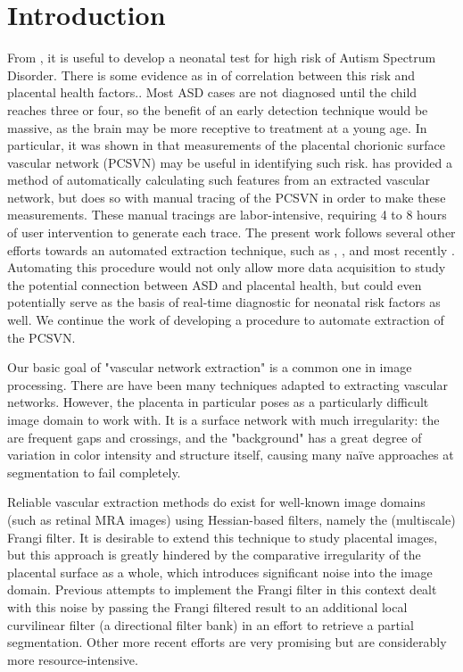 \chapter{Introduction} \label{ch:introduction}

From \cite{chang2017}, it is useful to develop a neonatal test for high risk of
Autism Spectrum Disorder. There is some evidence as in \cite{chang2016whole}
of correlation between this risk and placental health factors.. Most ASD
cases are not diagnosed until the child reaches three or four, so the benefit
of an early detection technique would be massive, as the brain may be more
receptive to treatment at a young age. In particular, it was shown in
\cite{chang2016whole} that measurements of the placental chorionic surface
vascular network (PCSVN) may be useful in identifying such risk.
\cite{chang2017} has provided a method of automatically calculating such
features from an extracted vascular network, but does so with manual tracing of
the PCSVN in order to make these measurements.  These manual tracings are
labor-intensive, requiring 4 to 8 hours of user intervention to generate each trace.
The present work follows several other efforts towards an automated extraction
technique, such as \cite{almoussa-ucla-reu}, \cite{huynh2013filter}, and
most recently \cite{djima2017enhancing}. Automating this procedure would not
only allow more data acquisition to study the potential connection between ASD
and placental health, but could even potentially serve as the basis of real-time
diagnostic for neonatal risk factors as well. We continue the work of
developing a procedure to automate extraction of the PCSVN.


Our basic goal of "vascular network extraction" is a common one in image
processing. There are have been many techniques adapted to extracting vascular
networks. However, the placenta in particular poses as a particularly difficult
image domain to work with. It is a surface network with much irregularity: the are
frequent gaps and crossings, and the "background" has a great degree of variation in
color intensity and structure itself, causing many na\"{i}ve
approaches at segmentation to fail completely.

Reliable vascular extraction methods do exist for well-known image domains
(such as retinal MRA images) using Hessian-based filters, namely the (multiscale) Frangi filter.
It is desirable to extend this technique to study placental images, but this
approach is greatly hindered by the comparative irregularity of the placental
surface as a whole, which introduces significant noise into the image domain.
Previous attempts to implement the Frangi filter in this context \cite{huynh2013filter}
dealt with this noise by passing the Frangi filtered result to an additional local
curvilinear filter (a directional filter bank) in an effort to retrieve a partial
segmentation. Other more recent efforts \cite{djima2017enhancing} are very promising
but are considerably more resource-intensive.

